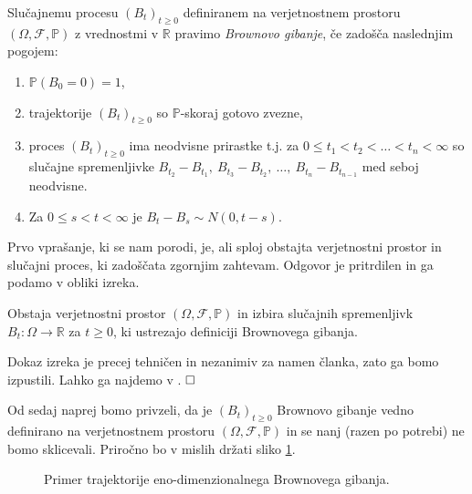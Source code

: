 \documentclass[twoside,11pt]{article}
\begin{document}
\begin{definicija}
    Slučajnemu procesu $(B_t)_{t\geq 0}$ definiranem na verjetnostnem prostoru $(\Omega, \mathcal{F}, \mathbb{P})$
    z vrednostmi v $\mathbb{R}$ pravimo \textit{Brownovo gibanje}, če 
    zadošča naslednjim pogojem:
    \begin{enumerate}
        \item $\mathbb{P}(B_0 = 0) = 1$,
        \item trajektorije $(B_t)_{t\geq0}$ so $\mathbb{P}$-skoraj gotovo zvezne,
        \item proces $\left(B_t\right)_{t \geq 0}$ ima neodvisne prirastke t.j. za $0 \leq t_1 < t_2 < \dots < t_n < \infty$ so slučajne spremenljivke
            $B_{t_2} - B_{t_1}, \ B_{t_3} - B_{t_2}, \ \dots, \ B_{t_n} - B_{t_{n-1}}$ med seboj neodvisne. 
        \item Za $ 0 \leq s < t < \infty$ je $B_t - B_s \sim N(0, t-s)$.
    \end{enumerate}
\end{definicija}
        
Prvo vprašanje, ki se nam porodi, je, ali sploj obstajta verjetnostni prostor 
in slučajni proces, ki zadoščata zgornjim zahtevam. Odgovor je pritrdilen in ga 
podamo v obliki izreka.

\begin{izrek}
    Obstaja verjetnostni prostor $(\Omega, \mathcal{F}, \mathbb{P})$ in
    izbira slučajnih spremenljivk $B_t : \Omega \to \mathbb{R}$ za $t \geq 0$,
    ki ustrezajo definiciji Brownovega gibanja.
\end{izrek}

\begin{dokaz}
    Dokaz izreka je precej tehničen in nezanimiv za namen članka, zato ga bomo izpustili.
     Lahko ga najdemo v \cite{1}. $\hfill \square$
\end{dokaz}


Od sedaj naprej bomo privzeli, da je $(B_t)_{t\geq 0}$ Brownovo gibanje vedno definirano na 
verjetnostnem prostoru $(\Omega, \mathcal{F}, \mathbb{P})$ in se nanj (razen po potrebi) ne 
bomo sklicevali. Priročno bo v mislih držati sliko \ref{fig:slika2}.

\begin{figure}[h]
    \centering
    \caption{Primer trajektorije eno-dimenzionalnega Brownovega gibanja.}
    \label{fig:slika2}
\end{figure}
\end{document}
